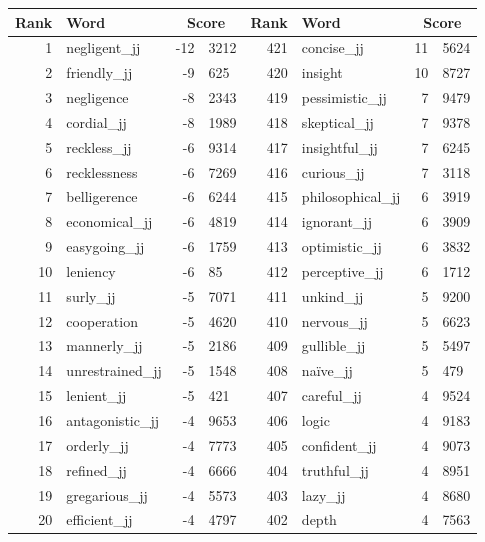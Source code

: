 \begin{table}[tbp]
    \begin{tabular}{| rlr@{.}l | rlr@{.}l |}
    \hline
    \textbf{Rank} & \textbf{Word} & \multicolumn{2}{c|}{\textbf{Score}} & \textbf{Rank} & \textbf{Word} & \multicolumn{2}{c|}{\textbf{Score}} \\
    \hline
    1 & negligent\_jj & -12 & 3212    &    421 & concise\_jj & 11 & 5624 \\
    2 & friendly\_jj & -9 & 625    &    420 & insight & 10 & 8727 \\
    3 & negligence & -8 & 2343    &    419 & pessimistic\_jj & 7 & 9479 \\
    4 & cordial\_jj & -8 & 1989    &    418 & skeptical\_jj & 7 & 9378 \\
    5 & reckless\_jj & -6 & 9314    &    417 & insightful\_jj & 7 & 6245 \\
    6 & recklessness & -6 & 7269    &    416 & curious\_jj & 7 & 3118 \\
    7 & belligerence & -6 & 6244    &    415 & philosophical\_jj & 6 & 3919 \\
    8 & economical\_jj & -6 & 4819    &    414 & ignorant\_jj & 6 & 3909 \\
    9 & easygoing\_jj & -6 & 1759    &    413 & optimistic\_jj & 6 & 3832 \\
    10 & leniency & -6 & 85    &    412 & perceptive\_jj & 6 & 1712 \\
    11 & surly\_jj & -5 & 7071    &    411 & unkind\_jj & 5 & 9200 \\
    12 & cooperation & -5 & 4620    &    410 & nervous\_jj & 5 & 6623 \\
    13 & mannerly\_jj & -5 & 2186    &    409 & gullible\_jj & 5 & 5497 \\
    14 & unrestrained\_jj & -5 & 1548    &    408 & naïve\_jj & 5 & 479 \\
    15 & lenient\_jj & -5 & 421    &    407 & careful\_jj & 4 & 9524 \\
    16 & antagonistic\_jj & -4 & 9653    &    406 & logic & 4 & 9183 \\
    17 & orderly\_jj & -4 & 7773    &    405 & confident\_jj & 4 & 9073 \\
    18 & refined\_jj & -4 & 6666    &    404 & truthful\_jj & 4 & 8951 \\
    19 & gregarious\_jj & -4 & 5573    &    403 & lazy\_jj & 4 & 8680 \\
    20 & efficient\_jj & -4 & 4797    &    402 & depth & 4 & 7563 \\

\end{tabular}
\end{table}
